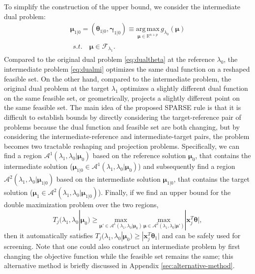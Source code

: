 To simplify the construction of the upper bound, we consider the intermediate dual problem:
\begin{gather}
        \label{eq:dualmi}
        \boldsymbol\mu_{1|0}=(\boldsymbol\theta_{1|0},\boldsymbol\gamma_{1|0})\equiv\underset{\boldsymbol\mu\in \mathbb{R}^{ n+p}}{\mathrm{arg\,max}}\,g_{\lambda_0}(\boldsymbol\mu)\\
        \begin{aligned}s.t.\quad \boldsymbol\mu\in \mathcal{F}_{\lambda_1}\nonumber.
        \end{aligned}
\end{gather}
Compared to the original dual problem \eqref{eq:dualtheta} at the reference $\lambda_0$, the intermediate problem \eqref{eq:dualmi} optimizes the same dual function on a reshaped feasible set. On the other hand, compared to the intermediate problem, the original dual problem at the target $\lambda_1$ optimizes a slightly different dual function on the same feasible set, or geometrically, projects a slightly different point on the same feasible set. The main idea of the proposed SPARSE rule is that it is difficult to establish bounds by directly considering the target-reference pair of problems because the dual function and feasible set are both changing, but by considering the intermediate-reference and intermediate-target pairs, the problem becomes two tractable reshaping and projection problems. Specifically, we can find a region $\mathcal{A}^1(\lambda_1,\lambda_0|\boldsymbol\mu_0)$ based on the reference solution $\boldsymbol\mu_0$, that contains the intermediate solution ($\boldsymbol\mu_{1|0}\in \mathcal{A}^1(\lambda_1,\lambda_0|\boldsymbol\mu_0)$) and subsequently find a region $\mathcal{A}^2(\lambda_1,\lambda_0|\boldsymbol\mu_{1|0})$ based on the intermediate solution $\boldsymbol\mu_{1|0}$, that contains the target solution  ($\boldsymbol\mu_1\in \mathcal{A}^2(\lambda_1,\lambda_0|\boldsymbol\mu_{1|0})$). Finally, if we find an upper bound for the double maximization problem over the two regions,
\begin{equation}
    \label{eq:boundbound}
    T_j(\lambda_{1},\lambda_{0}|\boldsymbol\mu_0)\geq \underset{\boldsymbol\mu'\in\mathcal{A}^1(\lambda_1,\lambda_0|\boldsymbol\mu_0)}{\mathrm{max}}\,\underset{\boldsymbol\mu\in\mathcal{A}^2(\lambda_1,\lambda_0|\boldsymbol\mu')}{\mathrm{max}}|\boldsymbol x_j^T\boldsymbol\theta|,
\end{equation}
then it automatically satisfies $T_j(\lambda_{1},\lambda_{0}|\boldsymbol\mu_0)\geq |\boldsymbol x_j^T\boldsymbol\theta_1|$ and can be safely used for screening. Note that one could also construct an intermediate problem by first changing the objective function while the feasible set remains the same; this alternative method is briefly discussed in Appendix \ref{sec:alternative-method}.

